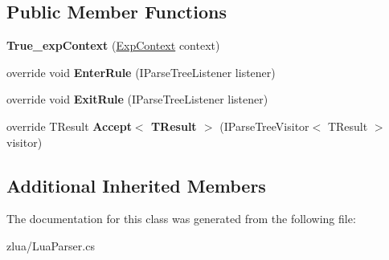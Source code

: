 \subsection*{Public Member Functions}
\begin{DoxyCompactItemize}
\item 
\mbox{\label{classzlua_1_1_lua_parser_1_1_true__exp_context_a5280eecc31b3ac2e4135202b5e92696c}} 
{\bfseries True\+\_\+exp\+Context} (\mbox{\hyperlink{classzlua_1_1_lua_parser_1_1_exp_context}{Exp\+Context}} context)
\item 
\mbox{\label{classzlua_1_1_lua_parser_1_1_true__exp_context_a23c4972e684a479e8a88bac36217085d}} 
override void {\bfseries Enter\+Rule} (I\+Parse\+Tree\+Listener listener)
\item 
\mbox{\label{classzlua_1_1_lua_parser_1_1_true__exp_context_ae3de67006ddd01c54c7b11c64ea351c6}} 
override void {\bfseries Exit\+Rule} (I\+Parse\+Tree\+Listener listener)
\item 
\mbox{\label{classzlua_1_1_lua_parser_1_1_true__exp_context_a08a95d4228331882701cc1c2cb1d8531}} 
override T\+Result {\bfseries Accept$<$ T\+Result $>$} (I\+Parse\+Tree\+Visitor$<$ T\+Result $>$ visitor)
\end{DoxyCompactItemize}
\subsection*{Additional Inherited Members}


The documentation for this class was generated from the following file\+:\begin{DoxyCompactItemize}
\item 
zlua/Lua\+Parser.\+cs\end{DoxyCompactItemize}
